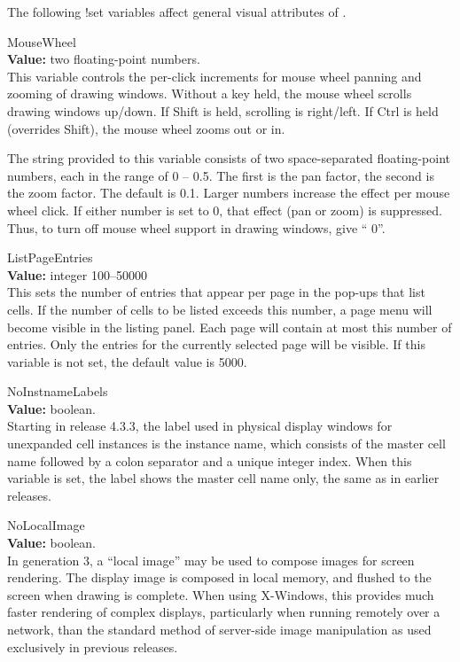 The following {\cb !set} variables affect general visual attributes of
{\Xic}.

\begin{description}
\item{\et MouseWheel}\\
{\bf Value:} two floating-point numbers.\\
This variable controls the per-click increments for mouse wheel
panning and zooming of drawing windows.  Without a key held, the
mouse wheel scrolls drawing windows up/down.  If {\kb Shift} is held,
scrolling is right/left.  If {\kb Ctrl} is held (overrides {\kb
Shift}), the mouse wheel zooms out or in.

The string provided to this variable consists of two space-separated
floating-point numbers, each in the range of 0 -- 0.5.  The first is
the pan factor, the second is the zoom factor.  The default is { 0.1}.  Larger numbers increase the effect per mouse wheel click. 
If either number is set to 0, that effect (pan or zoom) is
suppressed.  Thus, to turn off mouse wheel support in drawing windows,
give ``{ 0}''.

\item{\et ListPageEntries}\\
{\bf Value:} integer 100--50000\\
This sets the number of entries that appear per page in the pop-ups
that list cells.  If the number of cells to be listed exceeds this
number, a page menu will become visible in the listing panel.  Each
page will contain at most this number of entries.  Only the entries
for the currently selected page will be visible.  If this variable is
not set, the default value is 5000.

\item{\et NoInstnameLabels}\\
{\bf Value:} boolean.\\
Starting in release 4.3.3, the label used in physical display windows
for unexpanded cell instances is the instance name, which consists of
the master cell name followed by a colon separator and a unique
integer index.  When this variable is set, the label shows the master
cell name only, the same as in earlier {\Xic} releases.

\item{\et NoLocalImage}\\
{\bf Value:} boolean.\\
In {\Xic} generation 3, a ``local image'' may be used to compose
images for screen rendering.  The display image is composed in local
memory, and flushed to the screen when drawing is complete.  When
using X-Windows, this provides much faster rendering of complex
displays, particularly when running remotely over a network, than the
standard method of server-side image manipulation as used exclusively
in previous {\Xic} releases.


\end{description}
